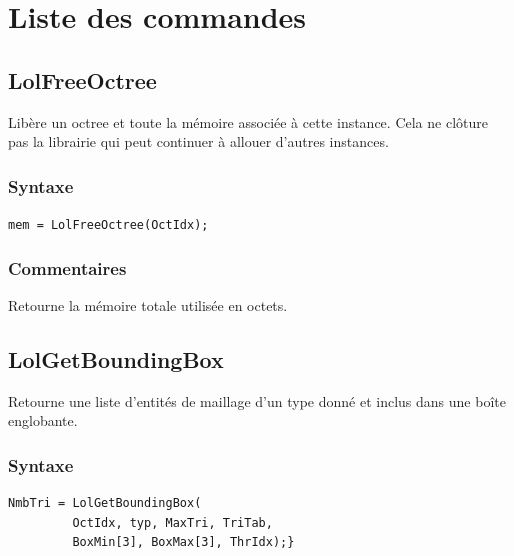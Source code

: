 \documentclass[a4paper,12pt]{article}
\begin{document}
%
%

\clearpage
\section{Liste des commandes}


\subsection{LolFreeOctree}
Libère un octree et toute la mémoire associée à cette instance. Cela ne clôture pas la librairie qui peut continuer à allouer d'autres instances.

\subsubsection*{Syntaxe}
{\tt mem = LolFreeOctree(OctIdx);}

\subsubsection*{Commentaires}
Retourne la mémoire totale utilisée en octets.


\subsection{LolGetBoundingBox}
Retourne une liste d'entités de maillage d'un type donné et inclus dans une boîte englobante.

\subsubsection*{Syntaxe}
\begin{tt}
\begin{verbatim}
NmbTri = LolGetBoundingBox(
         OctIdx, typ, MaxTri, TriTab,
         BoxMin[3], BoxMax[3], ThrIdx);}
\end{verbatim}
\end{tt}
\normalfont
\end{document}
